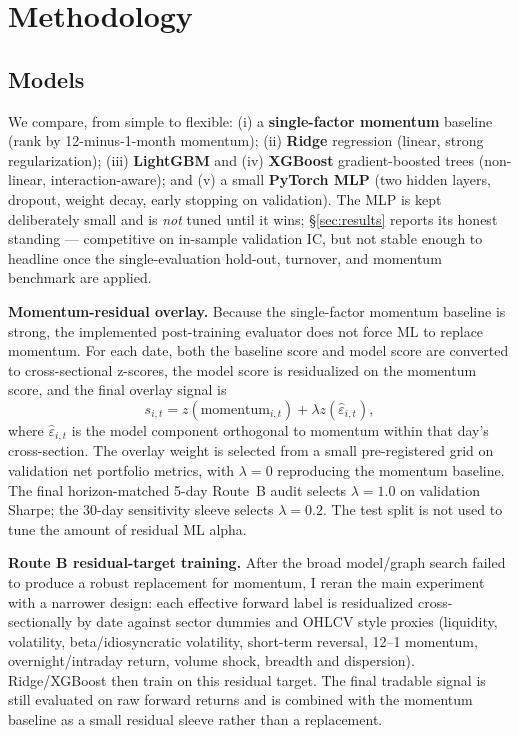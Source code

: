 \documentclass[9pt]{extarticle}
\begin{document}
\section{Methodology}

\subsection{Models}
We compare, from simple to flexible:
(i) a \textbf{single-factor momentum} baseline (rank by 12-minus-1-month
momentum); (ii) \textbf{Ridge} regression (linear, strong regularization);
(iii) \textbf{LightGBM} and (iv) \textbf{XGBoost} gradient-boosted trees
(non-linear, interaction-aware); and (v) a small \textbf{PyTorch MLP}
(two hidden layers, dropout, weight decay, early stopping on validation). The
MLP is kept deliberately small and is \emph{not} tuned until it wins;
\S\ref{sec:results} reports its honest standing --- competitive on in-sample
validation IC, but not stable enough to headline once the single-evaluation hold-out,
turnover, and momentum benchmark are applied.

\textbf{Momentum-residual overlay.} Because the single-factor momentum baseline
is strong, the implemented post-training evaluator does not force ML to replace
momentum. For each date, both the baseline score and model score are converted
to cross-sectional z-scores, the model score is residualized on the momentum
score, and the final overlay signal is
\[
  s_{i,t}=z(\text{momentum}_{i,t})+\lambda z(\widehat{\varepsilon}_{i,t}),
\]
where $\widehat{\varepsilon}_{i,t}$ is the model component orthogonal to
momentum within that day's cross-section. The overlay weight is selected from a
small pre-registered grid on validation net portfolio metrics, with
$\lambda{=}0$ reproducing the momentum baseline. The final horizon-matched
5-day Route~B audit selects $\lambda{=}1.0$ on validation Sharpe; the 30-day
sensitivity sleeve selects $\lambda{=}0.2$. The test split is not used to tune
the amount of residual ML alpha.

\textbf{Route B residual-target training.} After the broad model/graph search
failed to produce a robust replacement for momentum, I reran the main experiment
with a narrower design: each effective forward label is residualized
cross-sectionally by date against sector dummies and OHLCV style proxies
(liquidity, volatility, beta/idiosyncratic volatility, short-term reversal,
12--1 momentum, overnight/intraday return, volume shock, breadth and dispersion).
Ridge/XGBoost then train on this residual target. The final tradable signal is
still evaluated on raw forward returns and is combined with the momentum
baseline as a small residual sleeve rather than a replacement.
\end{document}
